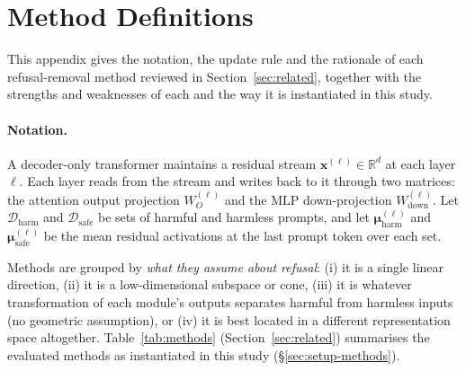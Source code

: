 \section{Method Definitions}
\label{app:method-defs}
\label{sec:methods}
\label{app:methods}%

This appendix gives the notation, the update rule and the rationale of each
refusal-removal method reviewed in Section~\ref{sec:related}, together with
the strengths and weaknesses of each and the way it is instantiated in this
study.

\paragraph{Notation.}
A decoder-only transformer maintains a residual stream
$\mathbf{x}^{(\ell)} \in \mathbb{R}^{d}$ at each layer $\ell$. Each layer reads
from the stream and writes back to it through two matrices:
the attention output projection $W_O^{(\ell)}$ and the MLP down-projection
$W_{\mathrm{down}}^{(\ell)}$. Let $\mathcal{D}_{\mathrm{harm}}$ and
$\mathcal{D}_{\mathrm{safe}}$ be sets of harmful and harmless prompts, and let
$\boldsymbol{\mu}^{(\ell)}_{\mathrm{harm}}$ and
$\boldsymbol{\mu}^{(\ell)}_{\mathrm{safe}}$ be the mean residual activations at
the last prompt token over each set.

Methods are grouped by \emph{what they assume about refusal}: (i) it is a single
linear direction, (ii) it is a low-dimensional subspace or cone, (iii) it is
whatever transformation of each module's outputs separates harmful from
harmless inputs (no geometric assumption), or (iv) it is best located in a
different representation space altogether. Table~\ref{tab:methods}
(Section~\ref{sec:related}) summarises
the evaluated methods as instantiated in this study (\S\ref{sec:setup-methods}).

